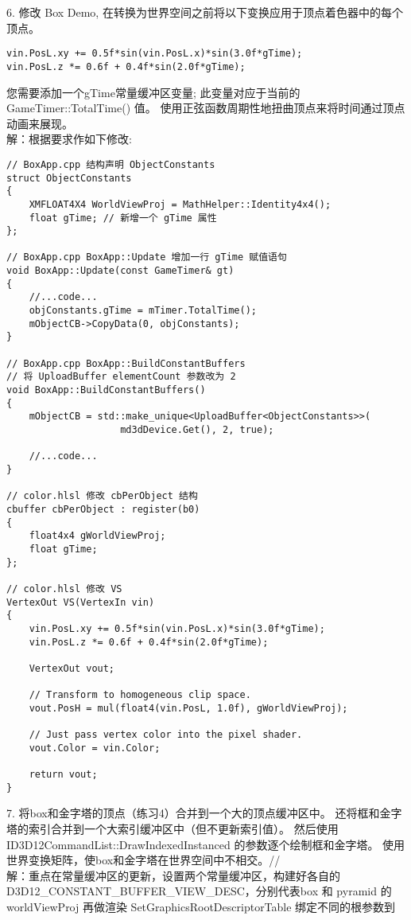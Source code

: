 \begin{flushleft}
6. 修改 Box Demo, 在转换为世界空间之前将以下变换应用于顶点着色器中的每个顶点。
\end{flushleft}
\begin{lstlisting}
vin.PosL.xy += 0.5f*sin(vin.PosL.x)*sin(3.0f*gTime);
vin.PosL.z *= 0.6f + 0.4f*sin(2.0f*gTime);
\end{lstlisting}
\begin{flushleft}
您需要添加一个gTime常量缓冲区变量; 此变量对应于当前的 GameTimer::TotalTime() 值。 使用正弦函数周期性地扭曲顶点来将时间通过顶点动画来展现。\\
解：根据要求作如下修改:
\end{flushleft}
\begin{lstlisting}
// BoxApp.cpp 结构声明 ObjectConstants
struct ObjectConstants
{
    XMFLOAT4X4 WorldViewProj = MathHelper::Identity4x4();
    float gTime; // 新增一个 gTime 属性
};

// BoxApp.cpp BoxApp::Update 增加一行 gTime 赋值语句
void BoxApp::Update(const GameTimer& gt)
{
    //...code...
    objConstants.gTime = mTimer.TotalTime();
    mObjectCB->CopyData(0, objConstants);
}

// BoxApp.cpp BoxApp::BuildConstantBuffers 
// 将 UploadBuffer elementCount 参数改为 2
void BoxApp::BuildConstantBuffers()
{
    mObjectCB = std::make_unique<UploadBuffer<ObjectConstants>>(
                    md3dDevice.Get(), 2, true);

    //...code...
}

// color.hlsl 修改 cbPerObject 结构
cbuffer cbPerObject : register(b0)
{
    float4x4 gWorldViewProj;
    float gTime;
};

// color.hlsl 修改 VS
VertexOut VS(VertexIn vin)
{
    vin.PosL.xy += 0.5f*sin(vin.PosL.x)*sin(3.0f*gTime);
    vin.PosL.z *= 0.6f + 0.4f*sin(2.0f*gTime);

    VertexOut vout;

    // Transform to homogeneous clip space.
    vout.PosH = mul(float4(vin.PosL, 1.0f), gWorldViewProj);
    
    // Just pass vertex color into the pixel shader.
    vout.Color = vin.Color;

    return vout;
}
\end{lstlisting}

\begin{flushleft}
7. 将box和金字塔的顶点（练习4）合并到一个大的顶点缓冲区中。 还将框和金字塔的索引合并到一个大索引缓冲区中（但不更新索引值）。 然后使用 ID3D12CommandList::DrawIndexedInstanced 的参数逐个绘制框和金字塔。 使用世界变换矩阵，使box和金字塔在世界空间中不相交。//
~\\
解：重点在常量缓冲区的更新，设置两个常量缓冲区，构建好各自的 D3D12_CONSTANT_BUFFER_VIEW_DESC，分别代表box 和 pyramid 的 worldViewProj 再做渲染
SetGraphicsRootDescriptorTable 绑定不同的根参数到
\end{flushleft}

